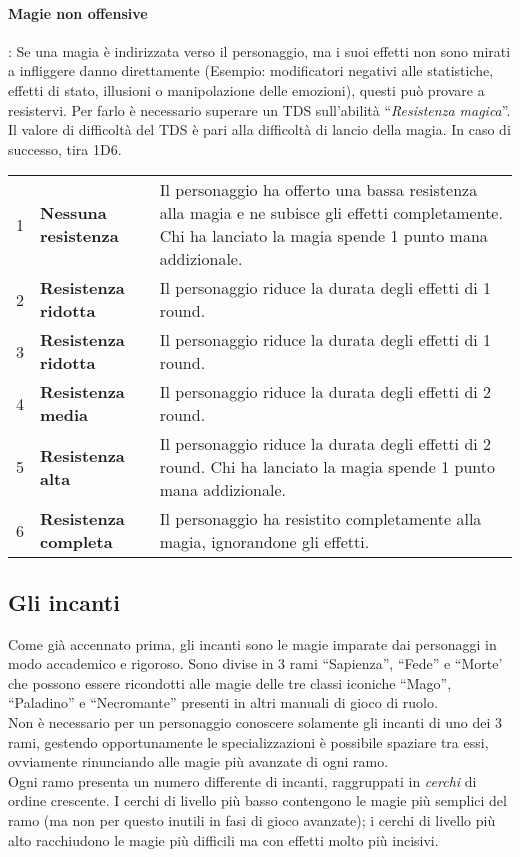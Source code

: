 \documentclass[../manuale_main.tex]{subfiles}
\begin{document}
\paragraph{\textbf{Magie non offensive}}: Se una magia è indirizzata verso il personaggio, ma i suoi effetti non sono mirati a infliggere danno direttamente (Esempio: modificatori negativi alle statistiche, effetti di stato, illusioni o manipolazione delle emozioni), questi può provare a resistervi. Per farlo è necessario superare un TDS sull’abilità ``\emph{Resistenza magica}''. Il valore di difficoltà del TDS è pari alla difficoltà di lancio della magia. In caso di successo, tira 1D6.

\begin{tabularx}{\linewidth}{c l X}
1&\textbf{Nessuna resistenza}&Il personaggio ha offerto una bassa resistenza alla magia e ne subisce gli effetti completamente. Chi ha lanciato la magia spende 1 punto mana addizionale.\\
2&\textbf{Resistenza ridotta}&Il personaggio riduce la durata degli effetti di 1 round.\\
3&\textbf{Resistenza ridotta}&Il personaggio riduce la durata degli effetti di 1 round.\\
4&\textbf{Resistenza media}&Il personaggio riduce la durata degli effetti di 2 round.\\
5&\textbf{Resistenza alta}&Il personaggio riduce la durata degli effetti di 2 round. Chi ha lanciato la magia spende 1 punto mana addizionale.\\
6&\textbf{Resistenza completa}&Il personaggio ha resistito completamente alla magia, ignorandone gli effetti.\\
\end{tabularx}

\subsection{Gli incanti}
Come già accennato prima, gli incanti sono le magie imparate dai personaggi in modo accademico e rigoroso.
Sono divise in 3 rami ``Sapienza'', ``Fede'' e ``Morte' che possono essere ricondotti alle magie delle tre classi iconiche ``Mago'', ``Paladino'' e ``Necromante'' presenti in altri manuali di gioco di ruolo.\\
Non è necessario per un personaggio conoscere solamente gli incanti di uno dei 3 rami, gestendo opportunamente le specializzazioni è possibile spaziare tra essi, ovviamente rinunciando alle magie più avanzate di ogni ramo.\\
Ogni ramo presenta un numero differente di incanti, raggruppati in \emph{cerchi} di ordine crescente. I cerchi di livello più basso contengono le magie più semplici del ramo (ma non per questo inutili in fasi di gioco avanzate); i cerchi di livello più alto racchiudono le magie più difficili ma con effetti molto più incisivi.
\end{document}

